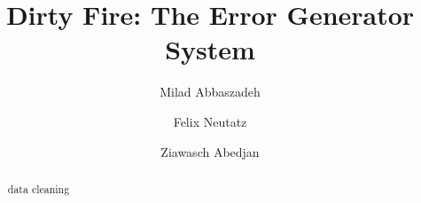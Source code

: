 \documentclass[conference]{IEEEtran}
\begin{document}
\title{Dirty Fire: The Error Generator System}

\author[1]{Milad Abbaszadeh}
\author[2]{Felix Neutatz}
\author[1]{Ziawasch Abedjan}



\maketitle



\begin{abstract}
data cleaning
\end{abstract}









\end{document}
